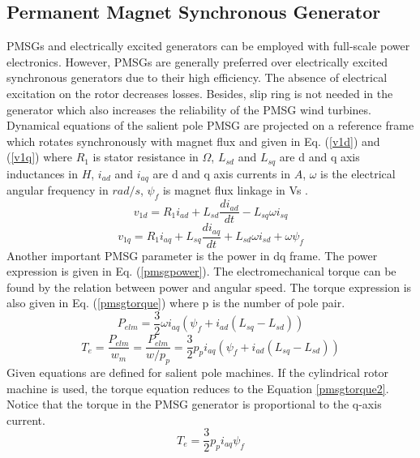 \subsection{Permanent Magnet Synchronous Generator}
\label{pmsgsection}
PMSGs and electrically excited generators can be employed with full-scale power electronics. However, PMSGs are generally preferred over electrically excited synchronous generators due to their high efficiency. The absence of electrical excitation on the rotor decreases losses. Besides, slip ring is not needed in the generator which also increases the reliability of the PMSG wind turbines. Dynamical equations of the salient pole PMSG are projected on a reference frame which rotates synchronously with magnet flux and given in Eq. (\ref{v1d}) and (\ref{v1q}) where $R_{1}$ is stator resistance in $\Omega$, $L_{sd}$ and $L_{sq}$ are d and q axis inductances in $H$, $i_{ad}$ and $i_{aq}$ are d and q axis currents in $A$, $\omega$ is the electrical angular frequency in $rad/s$, $\psi_{f}$ is magnet flux linkage in Vs \cite{Ackermann2005a}. 
\begin{equation}
v_{1d}=R_{1} i_{ad}+L_{sd}\frac{di_{ad}}{dt}-L_{sq}\omega i_{sq}
\label{v1d}
\end{equation}
\begin{equation}
v_{1q}=R_{1} i_{aq}+L_{sq}\frac{di_{aq}}{dt}+L_{sd}\omega i_{sd}+\omega \psi_{f}
\label{v1q}
\end{equation}
Another important PMSG parameter is the power in dq frame. The power expression is given in Eq. (\ref{pmsgpower}). The electromechanical torque can be found by the relation between power and angular speed. The torque expression is also given in Eq. (\ref{pmsgtorque}) where p is the number of pole pair.
\begin{equation}
P_{elm}=\frac{3}{2}\omega i_{aq} (\psi_{f}+i_{ad}(L_{sq}-L_{sd}))
\label{pmsgpower}
\end{equation}
\begin{equation}
T_{e}=\frac{P_{elm}}{w_{m}}=\frac{P_{elm}}{w/p_{p}}=\frac{3}{2}p_{p} i_{aq} (\psi_{f}+i_{ad}(L_{sq}-L_{sd}))
\label{pmsgtorque}
\end{equation}
Given equations are defined for salient pole machines. If the cylindrical rotor machine is used, the torque equation reduces to the Equation \ref{pmsgtorque2}. Notice that the torque in the PMSG generator is proportional to the q-axis current. 
\begin{equation}
T_{e}=\frac{3}{2}p_{p} i_{aq} \psi_{f}
\label{pmsgtorque2}
\end{equation}
